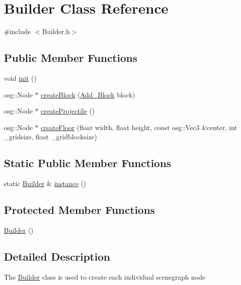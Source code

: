 \hypertarget{class_builder}{
\section{Builder Class Reference}
\label{class_builder}
}


{\ttfamily \#include $<$Builder.h$>$}\subsection*{Public Member Functions}
\begin{DoxyCompactItemize}
\item 
void \hyperlink{class_builder_ae10ac2d3acc2011587c48bc06ad33984}{init} ()
\item 
osg::Node $\ast$ \hyperlink{class_builder_acdb4f87505ee535c01b7df7a1ee2755b}{createBlock} (\hyperlink{class_add___block}{Add\_\-Block} block)
\item 
osg::Node $\ast$ \hyperlink{class_builder_a24f7e21014e2bb924abd4e2a519a1688}{createProjectile} ()
\item 
osg::Node $\ast$ \hyperlink{class_builder_a7c5d028d6996f58b2c45f948bfc6b5ab}{createFloor} (float width, float height, const osg::Vec3 \&center, int \_\-gridsize, float \_\-gridblocksize)
\end{DoxyCompactItemize}
\subsection*{Static Public Member Functions}
\begin{DoxyCompactItemize}
\item 
static \hyperlink{class_builder}{Builder} \& \hyperlink{class_builder_a260f9354517188703f594305928e50a2}{instance} ()
\end{DoxyCompactItemize}
\subsection*{Protected Member Functions}
\begin{DoxyCompactItemize}
\item 
\hyperlink{class_builder_af8e018e77879c6136e6dabbd5eab0634}{Builder} ()
\end{DoxyCompactItemize}


\subsection{Detailed Description}
The \hyperlink{class_builder}{Builder} class is used to create each individual scenegraph node 

